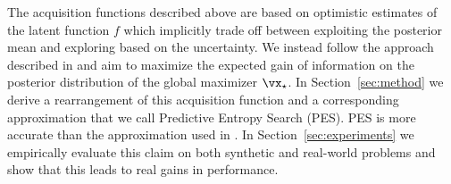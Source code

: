 The acquisition functions described above are based on optimistic estimates of
the latent function $f$ which implicitly trade off between exploiting the
posterior mean and exploring based on the uncertainty.  We instead follow the
approach described in \cite{HennigSchuler:2012} and aim to maximize the expected
gain of information on the posterior distribution of the global maximizer
$\xopt$.  In Section~\ref{sec:method} we derive a rearrangement of this
acquisition function and a corresponding approximation that we call Predictive
Entropy Search (PES). PES is more accurate than the approximation used in
\cite{HennigSchuler:2012}.  In Section~\ref{sec:experiments} we empirically
evaluate this claim on both synthetic and real-world problems and show that this
leads to real gains in performance.

